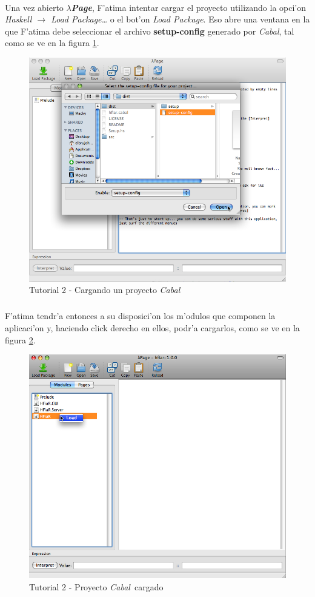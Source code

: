 \documentclass[a4paper]{article}
\newcommand{\hpage}{\textbf{\textsl{$\lambda$Page}}}
\newcommand{\cabal}{\textsl{Cabal}}
\begin{document}
\paragraph{}Una vez abierto \hpage, F'atima intentar cargar el proyecto utilizando la opci'on \textsl{Haskell $\rightarrow$ Load Package\ldots} o el bot'on \textsl{Load Package}.  Eso abre una ventana en la que F'atima debe seleccionar el archivo \textbf{setup-config} generado por \cabal, tal como se ve en la figura \ref{tut202}.
\begin{figure}[hp]
	\begin{center}
        	\includegraphics[width=.75\textwidth]{pictures/tut2/02}
		\caption{Tutorial 2 - Cargando un proyecto \cabal}
		\label{tut202}
	\end{center}
\end{figure}
\subparagraph{}F'atima tendr'a entonces a su disposici'on los m'odulos que componen la aplicaci'on y, haciendo click derecho en ellos, podr'a cargarlos, como se ve en la figura \ref{tut203}.
\begin{figure}[hp]
	\begin{center}
        	\includegraphics[width=.75\textwidth]{pictures/tut2/03}
		\caption{Tutorial 2 - Proyecto \cabal\ cargado}
		\label{tut203}
	\end{center}
\end{figure}
\newpage
\end{document}
